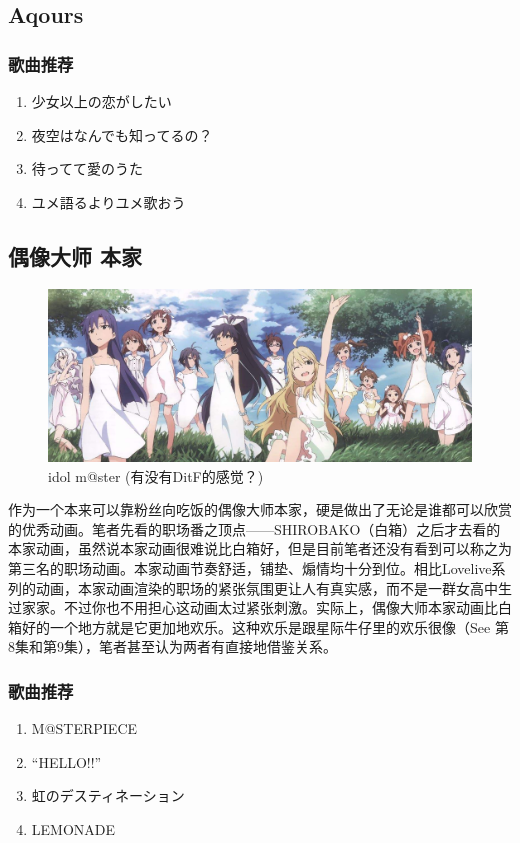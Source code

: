 \documentclass{ctexart}
\begin{document}
\subsection{Aqours}
\subsubsection*{歌曲推荐}
\begin{enumerate}
\item 少女以上の恋がしたい
\item 夜空はなんでも知ってるの？
\item 待ってて愛のうた
\item ユメ語るよりユメ歌おう
\end{enumerate}


\subsection{偶像大师 本家}
\begin{figure}[h]
\centering
 \includegraphics[width=1.0\textwidth]{im@s.jpg}
 \caption{idol m@ster (有没有DitF的感觉？)}
\end{figure}
作为一个本来可以靠粉丝向吃饭的偶像大师本家，硬是做出了无论是谁都可以欣赏的优秀动画。笔者先看的职场番之顶点——SHIROBAKO（白箱）之后才去看的本家动画，虽然说本家动画很难说比白箱好，但是目前笔者还没有看到可以称之为第三名的职场动画。本家动画节奏舒适，铺垫、煽情均十分到位。相比Lovelive系列的动画，本家动画渲染的职场的紧张氛围更让人有真实感，而不是一群女高中生过家家。不过你也不用担心这动画太过紧张刺激。实际上，偶像大师本家动画比白箱好的一个地方就是它更加地欢乐。这种欢乐是跟星际牛仔里的欢乐很像（See 第8集和第9集），笔者甚至认为两者有直接地借鉴关系。

\subsubsection*{歌曲推荐}
\begin{enumerate}
\item M@STERPIECE
\item “HELLO!!”
\item 虹のデスティネーション
\item LEMONADE
\end{enumerate}
\end{document}
